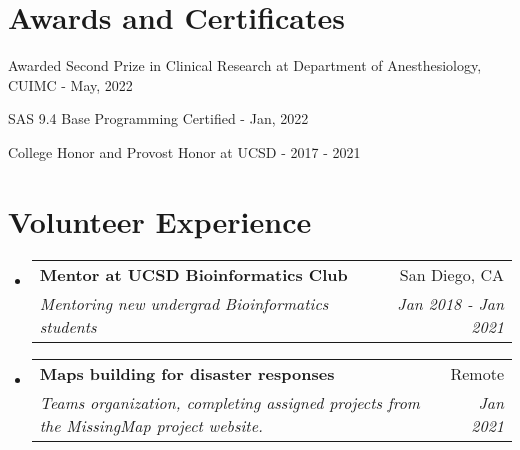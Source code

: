 \documentclass[a4paper,20pt]{article}
\makeatletter
\newcommand{\resumeSubheading}[4]{
  \vspace{-1pt}\item
    \begin{tabular*}{0.97\textwidth}{l@{\extracolsep{\fill}}r}
      \textbf{#1} & #2 \\
      \textit{#3} & \textit{#4} \\
    \end{tabular*}\vspace{-5pt}
}
\newcommand{\resumeSubHeadingListStart}{\begin{itemize}[leftmargin=*]}
\newcommand{\resumeSubHeadingListEnd}{\end{itemize}}
\makeatother
\begin{document}
\section{Awards and Certificates}
\begin{description}[font=$\bullet$]
\item {Awarded Second Prize in Clinical Research at Department of Anesthesiology, CUIMC - May, 2022}
\vspace{-5pt}
\item {SAS 9.4 Base Programming Certified - Jan, 2022}
\vspace{-5pt}
\item {College Honor and Provost Honor at UCSD - 2017 - 2021}

\end{description}

\vspace{-5pt}
\section{Volunteer Experience}
  \resumeSubHeadingListStart
	\resumeSubheading
    {Mentor at UCSD Bioinformatics Club}{San Diego, CA}
    {Mentoring new undergrad Bioinformatics students}{Jan 2018 - Jan 2021}
\vspace{5pt}
    \resumeSubheading
    {Maps building for disaster responses}{Remote}
    {Teams organization, completing assigned projects from the MissingMap project website.}{Jan 2021}

\resumeSubHeadingListEnd
\end{document}
